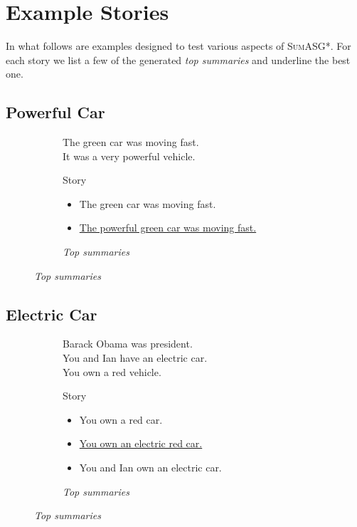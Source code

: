\chapter{Example Stories}
\label{appendix:stories}

In what follows are examples designed to test various aspects of \textsc{SumASG*}. For each story we list a few of the generated \textit{top summaries} and underline the best one.

\section{Powerful Car}

\begin{figure}[H]
\begin{subfigure}{0.5\textwidth}
\begin{displayquote}
The green car was moving fast.\\
It was a very powerful vehicle.
\end{displayquote}
\caption{Story}
\end{subfigure}
\begin{subfigure}{0.5\textwidth}
\begin{itemize}[nolistsep]
\item The green car was moving fast.
\item \underline{The powerful green car was moving fast.}
\end{itemize}
\vspace{\topsep}
\caption{\textit{Top summaries}}
\end{subfigure}
\end{figure}

\section{Electric Car}

\begin{figure}[H]
\begin{subfigure}{0.52\textwidth}
\begin{displayquote}
Barack Obama was president.\\
You and Ian have an electric car.\\
You own a red vehicle.
\end{displayquote}
\caption{Story}
\end{subfigure}
\begin{subfigure}{0.48\textwidth}
\begin{itemize}[nolistsep]
\item You own a red car.
\item \ul{You own an electric red car.}
\item You and Ian own an electric car.
\end{itemize}
\vspace{\topsep}
\caption{\textit{Top summaries}}
\end{subfigure}
\end{figure}

